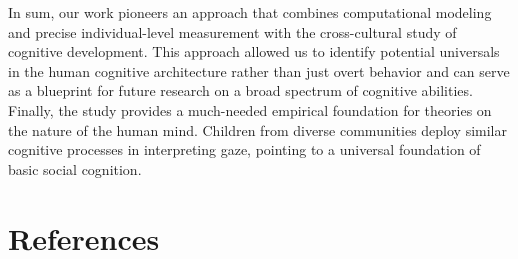 \documentclass[
  man,floatsintext]{apa7}
\begin{document}
In sum, our work pioneers an approach that combines computational modeling and precise individual-level measurement with the cross-cultural study of cognitive development. This approach allowed us to identify potential universals in the human cognitive architecture rather than just overt behavior and can serve as a blueprint for future research on a broad spectrum of cognitive abilities. Finally, the study provides a much-needed empirical foundation for theories on the nature of the human mind. Children from diverse communities deploy similar cognitive processes in interpreting gaze, pointing to a universal foundation of basic social cognition.

\newpage

\hypertarget{references}{%
\section{References}\label{references}}
\end{document}
